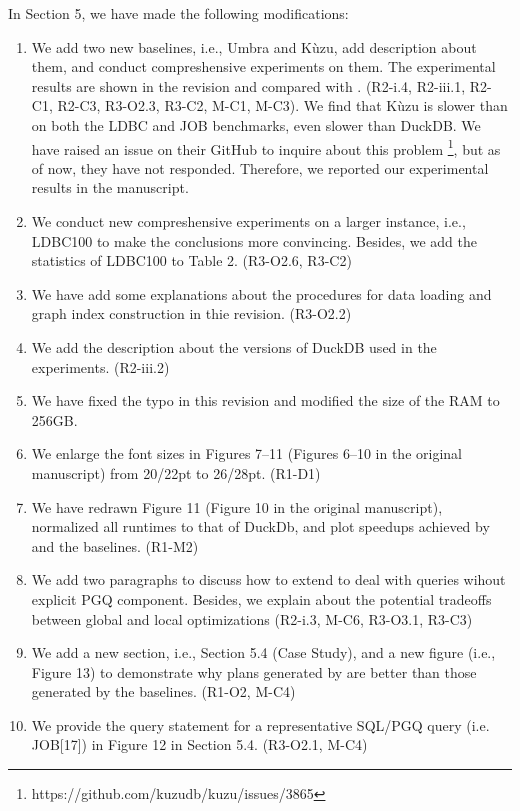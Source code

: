 \documentclass{article}
\begin{document}
In Section 5, we have made the following modifications:
\begin{enumerate}
	\item We add two new baselines, i.e., Umbra and K\`uzu, add description about them, and conduct compreshensive experiments on them. The experimental results are shown in the revision and compared with \name. (R2-i.4, R2-iii.1, R2-C1, R2-C3, R3-O2.3, R3-C2, M-C1, M-C3). We find that K\`uzu is slower than \name on both the LDBC and JOB benchmarks, even slower than DuckDB. We have raised an issue on their GitHub to inquire about this problem \footnote{https://github.com/kuzudb/kuzu/issues/3865}, but as of now, they have not responded. Therefore, we reported our experimental results in the manuscript.
	\item We conduct new compreshensive experiments on a larger instance, i.e., LDBC100 to make the conclusions more convincing. Besides, we add the statistics of LDBC100 to Table 2. (R3-O2.6, R3-C2)
	\item We have add some explanations about the procedures for data loading and graph index construction in thie revision. (R3-O2.2)
	\item We add the description about the versions of DuckDB used in the experiments. (R2-iii.2)
	\item We have fixed the typo in this revision and modified the size of the RAM to 256GB.
	\item We enlarge the font sizes in Figures 7--11 (Figures 6--10 in the original manuscript) from 20/22pt to 26/28pt. (R1-D1)
	\item We have redrawn Figure 11 (Figure 10 in the original manuscript), normalized all runtimes to that of DuckDb, and plot speedups achieved by \name and the baselines. (R1-M2)
	\item We add two paragraphs to discuss how to extend \name to deal with queries wihout explicit PGQ component. Besides, we explain about the potential tradeoffs between global and local optimizations (R2-i.3, M-C6, R3-O3.1, R3-C3)
	\item We add a new section, i.e., Section 5.4 (Case Study), and a new figure (i.e., Figure 13) to demonstrate why plans generated by \name are better than those generated by the baselines. (R1-O2, M-C4)
	\item We provide the query statement for a representative SQL/PGQ query (i.e. JOB[17]) in Figure 12 in Section 5.4. (R3-O2.1, M-C4)
\end{enumerate}
\end{document}
